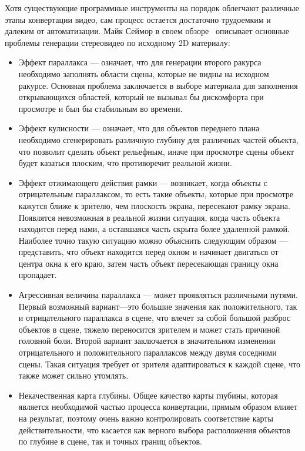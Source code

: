 \documentclass[14pt, a4paper]{extarticle}
\begin{document}
Хотя существующие программные инструменты на порядок облегчают различные 
этапы конвертации видео, сам процесс остается достаточно трудоемким и 
далеким от автоматизации. Майк Сеймор в своем обзоре~\cite{seymour2012art} 
описывает основные проблемы генерации стереовидео по исходному 2D материалу:
\begin{itemize}
	\item Эффект параллакса --- означает, что для генерации второго ракурса 
	необходимо заполнять области сцены, которые не видны на исходном ракурсе. 
	Основная проблема заключается в выборе материала для заполнения открывающихся 
	областей, который не вызывал бы дискомфорта при просмотре и был бы стабильным во времени.
	\item Эффект кулисности --- означает, что для объектов переднего плана необходимо 
	сгенерировать различную глубину для различных частей объекта, что позволит сделать 
	объект рельефным, иначе при просмотре сцены объект будет казаться плоским, 
	что противоречит реальной жизни.
	\item Эффект отжимающего действия рамки --- возникает, когда объекты с отрицательным 
	параллаксом, то есть такие объекты, которые при просмотре кажутся ближе к зрителю, 
	чем плоскость экрана, пересекают рамку экрана. Появлятся невозможная в реальной 
	жизни ситуация, когда часть объекта находится перед нами, а оставшаяся часть скрыта 
	более удаленной рамкой. Наиболее точно такую ситуацию можно объяснить следующим 
	образом --- представить, что объект находится перед окном и начинает двигаться 
	от центра окна к его краю, затем часть объект пересекающая границу окна пропадает.
	\item Агрессивная величина параллакса --- может проявляться различными путями. 
	Первый возможный вариант---это большие значения как положительного, так и 
	отрицательного параллакса в сцене, что влечет за собой большой разброс объектов 
	в сцене, тяжело переносится зрителем и может стать причиной головной боли. 
	Второй вариант заключается в значительном изменении отрицательного и положительного 
	параллаксов между двумя соседними сцены. Такая ситуация требует от зрителя 
	адаптироваться к каждой сцене, что также может сильно утомлять.
	\item Некачественная карта глубины. Общее качество карты глубины, которая является 
	необходимой частью процесса конвертации, прямым образом влияет на результат, 
	поэтому очень важно контролировать соответствие карты действительности, 
	что касается как верного выбора расположения объектов по глубине в сцене, 
	так и точных границ объектов.
\end{itemize}
\end{document}
